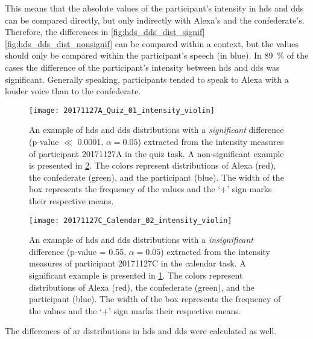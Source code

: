 This means that the absolute values of the participant's intensity in \ac{hds} and \ac{dds} can be compared directly, but only indirectly with Alexa's and the confederate's.
Therefore, the differences in \cref{fig:hds_dds_dist_signif} \cref{fig:hds_dds_dist_nonsignif} can be compared within a context, but the values should only be compared within the participant's speech (in blue).
In \SI{89}{\percent} of the cases the difference of the participant's intensity between \ac{hds} and \ac{dds} was significant.
Generally speaking, participants tended to speak to Alexa with a louder voice than to the confederate.
%
\begin{figure}[t]
	\centering
	\texttt{[image: 20171127A\_Quiz\_01\_intensity\_violin]}
	\caption[An interaction with significant \acs{hds} and \acs{dds} intensity distributions difference]
		{An example of \ac{hds} and \ac{dds} distributions with a \emph{significant} difference (p-value $\ll$ 0.0001, $\alpha=0.05$) extracted from the intensity measures of participant 20171127A in the quiz task.
		A non-significant example is presented in \cref{fig:hds_dds_violin_nonsignif}.
		The colors represent distributions of Alexa (red), the confederate (green), and the participant (blue).
		The width of the box represents the frequency of the values and the \enquote*{+} sign marks their respective means.}
	\label{fig:hds_dds_violin_signif}
\end{figure}
%
\begin{figure}
	\texttt{[image: 20171127C\_Calendar\_02\_intensity\_violin]}
	\caption[An interaction with insignificant \acs{hds} and \acs{dds} intensity distributions difference]
		{An example of \ac{hds} and \ac{dds} distributions with a \emph{insignificant} difference (p-value = 0.55, $\alpha=0.05$) extracted from the intensity measures of participant 20171127C in the calendar task.
		A significant example is presented in \cref{fig:hds_dds_violin_signif}.
		The colors represent distributions of Alexa (red), the confederate (green), and the participant (blue).
		The width of the box represents the frequency of the values and the \enquote*{+} sign marks their respective means.}
	\label{fig:hds_dds_violin_nonsignif}
\end{figure}
%
The differences of \acf{ar} distributions in \ac{hds} and \ac{dds} were calculated as well.
